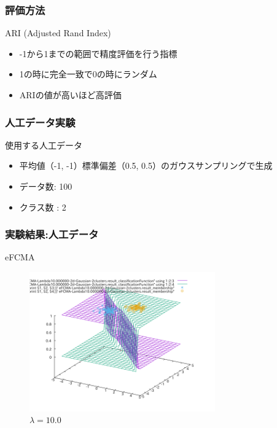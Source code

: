\documentclass[13pt,dvipdfmx]{beamer}
\begin{document}
\begin{frame}\frametitle{評価方法}
\begin{block}{ARI (Adjusted Rand Index)}
\begin{itemize}
 \item -1から1までの範囲で精度評価を行う指標
 \item 1の時に完全一致で0の時にランダム
 \item ARIの値が高いほど高評価
\end{itemize}
\end{block}
\begin{center}
\end{center}
\end{frame}

\begin{frame}\frametitle{人工データ実験}
  \begin{block}{使用する人工データ}
    \begin{itemize}
    \item 平均値（-1, -1）標準偏差（0.5, 0.5）のガウスサンプリングで生成
   　\item データ数: 100
    \item クラス数 : 2
    \end{itemize}
  \end{block}
\end{frame}

\begin{frame}\frametitle{実験結果:人工データ}
  \begin{block}{eFCMA}
   \begin{figure}[htbp]
    \begin{center}
    \includegraphics[height=60mm]{eFCMA-Lambda10.png}
   \end{center}
   \captionsetup{labelformat=empty,labelsep=none}
   \caption{$\lambda=10.0$}
  \end{figure}
 \end{block}
\end{frame}
\end{document}

